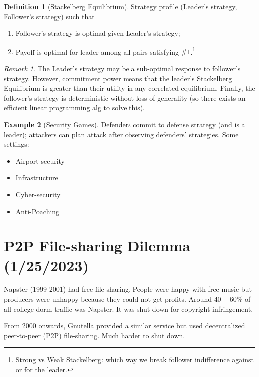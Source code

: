\documentclass[dvipsnames]{article}
\theoremstyle{definition}
\newtheorem{definition}{Definition}[section]
\newtheorem{example}[definition]{Example}
\theoremstyle{remark}
\newtheorem*{remark}{Remark}
\begin{document}
\begin{definition}[Stackelberg Equilibrium]
	Strategy profile (Leader's strategy, Follower's strategy) such that
	\begin{enumerate}
		\item Follower's strategy is optimal given Leader's strategy;
		\item Payoff is optimal for leader among all pairs satisfying $\#1$.\footnote{Strong vs Weak Stackelberg: which way we break follower indifference against or for the leader.}
	\end{enumerate}
\end{definition}

\begin{remark}
	The Leader's strategy may be a sub-optimal response to follower's strategy. However, commitment power means that the leader's Stackelberg Equilibrium is greater than their utility in any correlated equilibrium. Finally, the follower's strategy is deterministic without loss of generality (so there exists an efficient linear programming alg to solve this). 
\end{remark}

\begin{example}[Security Games]
	Defenders commit to defense strategy (and is a leader); attackers can plan attack after observing defenders' strategies. Some settings: 
	\begin{itemize}
		\item Airport security
		\item Infrastructure
		\item Cyber-security 
		\item Anti-Poaching
	\end{itemize}
\end{example}

\newpage

\section{P2P File-sharing Dilemma (1/25/2023)}

Napster (1999-2001) had free file-sharing. People were happy with free music but producers were unhappy because they could not get profits. Around $40-60\%$ of all college dorm traffic was Napster. It was shut down for copyright infringement. 

From 2000 onwards, Gnutella provided a similar service but used decentralized peer-to-peer (P2P) file-sharing. Much harder to shut down.
\end{document}
